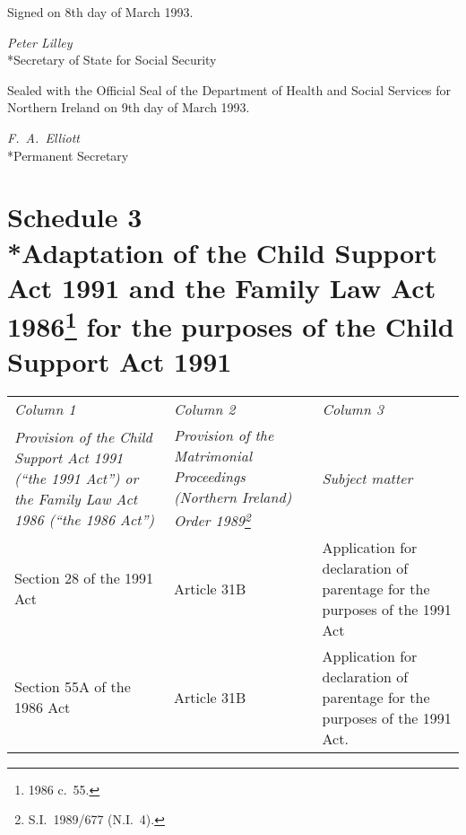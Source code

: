 \documentclass[12pt,a4paper]{article}
\begin{document}

\bigskip

Signed on 8th day of March 1993.

{\raggedleft
\emph{Peter Lilley}\\*Secretary of State for Social Security

}

\bigskip

Sealed with the Official Seal of the Department of Health and Social Services for Northern Ireland on 9th day of March 1993.


{\raggedleft
\emph{F.\ A.\ Elliott}\\*Permanent Secretary

}

\part[Schedule 3 --- Adaptation of the Child Support Act 1991 and the Family Law Act 1986 for the purposes of the Child Support Act 1991]{Schedule 3\\*Adaptation of the Child Support Act 1991 and the Family Law Act 1986\footnote{1986 c.\ 55.} for the purposes of the Child Support Act 1991}


\medskip

\noindent
{\footnotesize
\begin{longtable}{p{142.207pt}p{100.4398pt}p{111.34279pt}}
\hline
\itshape Column 1	& \itshape Column 2	& \itshape Column 3\\
\itshape Provision of the Child Support Act 1991 (“the 1991 Act”) or the Family Law Act 1986 (“the 1986 Act”)	& \itshape Provision of the Matrimonial Proceedings (Northern Ireland) Order 1989\footnote{S.I.\ 1989/677 (N.I.\ 4).}	& \itshape Subject matter\\
\hline
\endhead
\hline
\endlastfoot
Section 28 of the 1991 Act	&Article 31B	&Application for declaration of parentage for the purposes of the 1991 Act\\
Section 55A of the 1986 Act	&Article 31B	&Application for declaration of parentage for the purposes of the 1991 Act.\\
\end{longtable}

}
\end{document}
